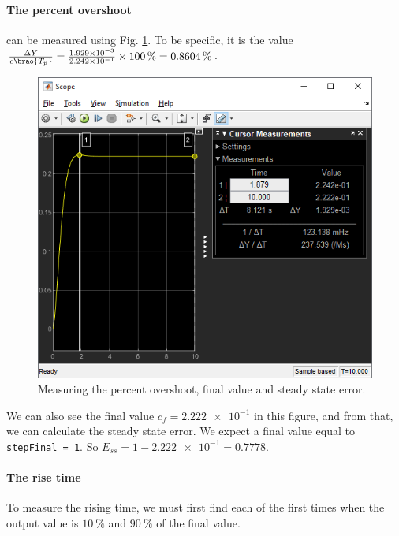 \documentclass[12pt]{article}
\DeclarePairedDelimiter\brao()%
\begin{document}
\paragraph{The percent overshoot} can be measured using Fig. \ref{fig:step - measuring percent overshoot}.
To be specific, it is the value $\frac{\Delta Y}{c\brao{T_p}} = \frac{\num{1.929e-03}}{\num{2.242e-1}}\times\SI{100}\percent = \SI{0.8604}\percent$.

\begin{figure}[h]
    \centering
    \includegraphics[width=\linewidth]{part01a_measuring_pcOS.png}
    \caption{Measuring the percent overshoot, final value and steady state error.}
    \label{fig:step - measuring percent overshoot}
\end{figure}

We can also see the final value $c_f = \num{2.222e-1}$ in this figure,
and from that, we can calculate the steady state error.
We expect a final value equal to \texttt{stepFinal = 1}.
So $E_{ss} = 1 - \num{2.222e-1} = 0.7778$.

\paragraph{The rise time} To measure the rising time,
we must first find each of the first times when the output value is $\SI{10}\percent$ and $\SI{90}\percent$
of the final value.
\end{document}
